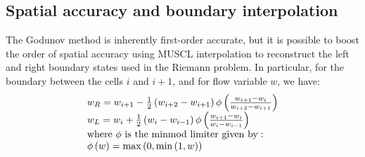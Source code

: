 \subsection{Spatial accuracy and boundary interpolation}
The Godunov method is inherently first-order accurate, but it is possible to boost the order of spatial accuracy using MUSCL interpolation to reconstruct the left and right boundary states used in the Riemann problem. In particular, for the boundary between the cells $i$ and $i+1$, and for flow variable $w$, we have:
\begin{equation}
\label{eq:MUSCL}
\begin{array}{l}
{w_R} = {w_{i + 1}} - \frac{1}{2}\left( {{w_{i + 2}} - {w_{i + 1}}} \right)\phi \left( {\frac{{{w_{i + 1}} - {w_i}}}{{{w_{i + 2}} - {w_{i + 1}}}}} \right)\\
{w_L} = {w_i} + \frac{1}{2}\left( {{w_i} - {w_{i - 1}}} \right)\phi \left( {\frac{{{w_{i + 1}} - {w_i}}}{{{w_i} - {w_{i - 1}}}}} \right)\\
{\rm{where~ }}\phi {\rm{ ~is~ the~ minmod~ limiter~ given~ by:}}\\
\phi \left( w \right) = \max \left( {0,\min \left( {1,w} \right)} \right)
\end{array}
\end{equation}

